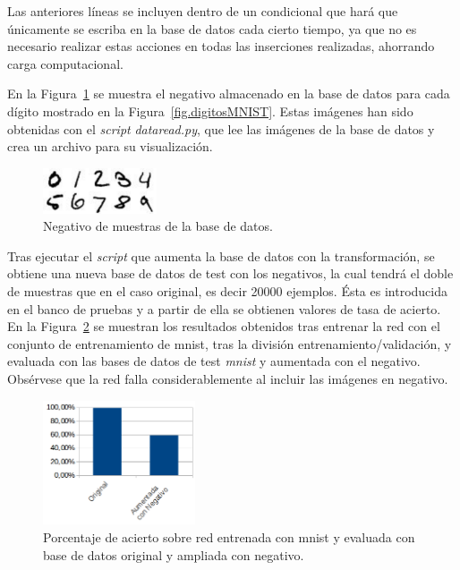 Las anteriores líneas se incluyen dentro de un condicional que hará que únicamente se escriba en la base de datos cada cierto tiempo, ya que no es necesario realizar estas acciones en todas las inserciones realizadas, ahorrando carga computacional.\\
\vspace{20pt}

En la Figura~\ref{fig.neg} se muestra el negativo almacenado en la base de datos para cada dígito mostrado en la Figura~\ref{fig.digitosMNIST}. Estas imágenes han sido obtenidas con el \textit{script} \textit{dataread.py}, que lee las imágenes de la base de datos y crea un archivo para su visualización.\\

\begin{figure}[H]
	\begin{center}
		\includegraphics[width=0.3\textwidth]{figures/negativo}
		\caption{Negativo de muestras de la base de datos.}
		\label{fig.neg}
	\end{center}
\end{figure}

Tras ejecutar el \textit{script} que aumenta la base de datos con la transformación, se obtiene una nueva base de datos de test con los negativos, la cual tendrá el doble de muestras que en el caso original, es decir 20000 ejemplos. Ésta es introducida en el banco de pruebas y a partir de ella se obtienen valores de tasa de acierto.\\

En la Figura~\ref{fig.neg-orig} se muestran los resultados obtenidos tras entrenar la red con el conjunto de entrenamiento  de \acrshort{mnist}, tras la división entrenamiento/validación, y evaluada con las bases de datos de test \textit{mnist} y aumentada con el negativo. Obsérvese que la red falla considerablemente al incluir las imágenes en negativo.

\begin{figure}[H]
	\begin{center}
		\includegraphics[width=0.4\textwidth]{figures/orig_neg}
		\caption{Porcentaje de acierto sobre red entrenada con \acrshort{mnist} y evaluada con base de datos original y ampliada con negativo.}
		\label{fig.neg-orig}
	\end{center}
\end{figure}

